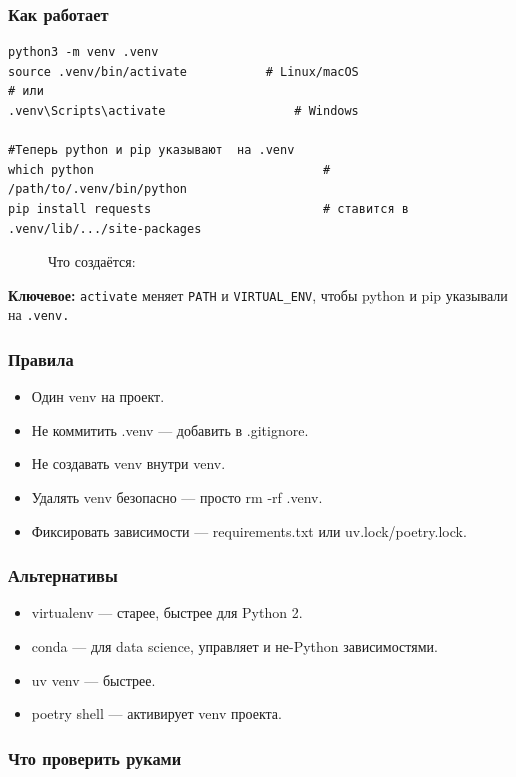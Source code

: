 \subsubsection{ Как работает}
\begin{lstlisting}
python3 -m venv .venv
source .venv/bin/activate 			# Linux/macOS
# или
.venv\Scripts\activate 					# Windows

#Теперь python и pip указывают  на .venv
which python 								# /path/to/.venv/bin/python
pip install requests 						# ставится в .venv/lib/.../site-packages
\end{lstlisting}
\begin{figure}[htbp]
  \resizebox{0.35\textwidth}{!}{}
  \caption{Что создаётся:}
  \label{fig:python-pipeline}
\end{figure}

\textbf{Ключевое:} \texttt{activate} меняет \verb|PATH| и \verb|VIRTUAL_ENV|, чтобы python и pip указывали на \texttt{.venv.}

\subsubsection{ Правила}
\begin{itemize}
\item Один venv на проект.
\item Не коммитить .venv — добавить в .gitignore.
\item Не создавать venv внутри venv.
\item Удалять venv безопасно — просто rm -rf .venv.
\item Фиксировать зависимости — requirements.txt или uv.lock/poetry.lock.
\end{itemize}
\subsubsection{Альтернативы}
\begin{itemize}
\item virtualenv — старее, быстрее для Python 2.
\item conda — для data science, управляет и не-Python зависимостями.
\item uv venv — быстрее.
\item poetry shell — активирует venv проекта.
\end{itemize}
\newpage
\subsubsection{ Что проверить руками}

